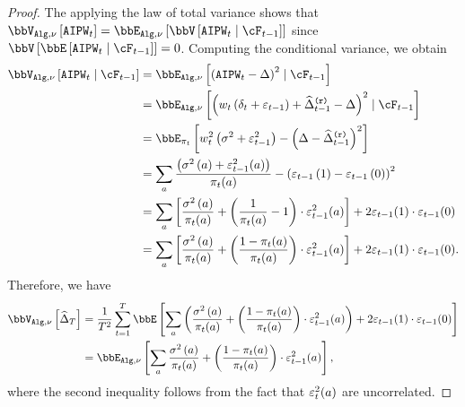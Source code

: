 \begin{proof}
    The applying the law of total variance shows that \(\V[\alg, \bandit]{\AIPW_\round} = \E[\alg, \bandit]{\V{\AIPW_\round}[\filtration_{\round - 1}]}\) since \(\V{\E{\AIPW_\round}[\filtration_{\round - 1}]} = 0\).
    Computing the conditional variance, we obtain
    \begin{align}
    \V[\alg, \bandit]{\AIPW_\round}[\filtration_{\round - 1}]
        &= \E[\alg, \bandit]{\paren{\AIPW_\round - \ATE}^2}[\filtration_{\round - 1}] \\
        &= \E[\alg, \bandit]{\paren{
            \iw_\round \paren{\rewardDeviation_{\round} + \estRewardError[\round - 1]} 
            + \estRewardATE[\round - 1] - \ATE}^{2}
            }[\filtration_{\round - 1}] \\
        &= \E[\policy_\round]{
                \iw^2_\round \paren{\var + \estRewardError[\round - 1]^2} 
                - \paren{\ATE - \estRewardATE[\round - 1]}^{2}
            } \\
        &= \sum_{\aidx} 
            \frac{\paren{\var[\aidx] + \estRewardError[\round - 1]^{2}(\aidx)} }
                {\policy_\round(\aidx)}
            - \paren{\estRewardError[\round - 1][\tidx] - \estRewardError[\round - 1][\cidx]}^2 \\
        &= \sum_{\aidx} \sbrk
            {
                \frac{\var[\aidx]}{\policy_\round(\aidx)} 
                + \paren{\frac{1}{\policy_\round(\aidx)} - 1} \cdot \estRewardError[\round - 1]^{2}(\aidx)
            }
            + 2 \estRewardError[\round - 1](\tidx)\cdot\estRewardError[\round - 1](\cidx) \\
        &= \sum_{\aidx} \sbrk
            {
                \frac{\var[\aidx]}{\policy_\round(\aidx)} 
                + \paren{\frac{1 - \policy_\round(\aidx)}{\policy_\round(\aidx)} } \cdot \estRewardError[\round - 1]^{2}(\aidx)
            }
            + 2 \estRewardError[\round - 1](\tidx)\cdot\estRewardError[\round - 1](\cidx).
\end{align}
Therefore, we have
\begin{align}
    \V[\alg, \bandit]{\estAIPW[\numRounds]} 
        &= \frac{1}{\numRounds^2} \sum_{\round = 1}^{\numRounds} \E{\sum_{\aidx} \paren
            {
                \frac{\var[\aidx]}{\policy_\round(\aidx)} 
                + \paren{\frac{1 - \policy_\round(\aidx)}{\policy_\round(\aidx)} } \cdot \estRewardError[\round - 1]^{2}(\aidx)
            }
            + 2\estRewardError[\round - 1](\tidx)\cdot\estRewardError[\round - 1](\cidx)} \\
         &= \E[\alg, \bandit]{\sum_{\aidx}
                \frac{\var[\aidx]}{\policy_\round(\aidx)} 
                + \paren{\frac{1 - \policy_\round(\aidx)}{\policy_\round(\aidx)} } \cdot \estRewardError[\round - 1]^{2}(\aidx)
            },
\end{align}
where the second inequality follows from the fact that $\estRewardError[\round]^{2}(\aidx)$ are uncorrelated.
\end{proof}


